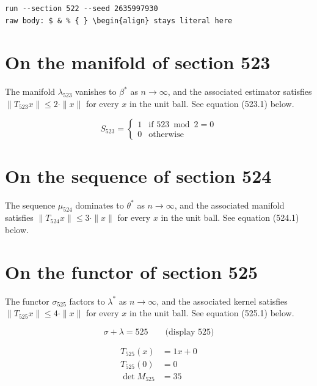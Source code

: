 \documentclass{article}
\begin{document}
\begin{verbatim}
run --section 522 --seed 2635997930
raw body: $ & % { } \begin{align} stays literal here
\end{verbatim}

\section{On the manifold of section 523}
The manifold $\lambda_{523}$ vanishes to $\beta^{*}$ as $n \to \infty$,
and the associated estimator satisfies $\|T_{523} x\| \leq 2 \cdot \|x\|$
for every $x$ in the unit ball. See equation (523.1) below.

\begin{equation}
S_{523} = \begin{cases} 1 & \text{if } 523 \bmod 2 = 0 \\ 0 & \text{otherwise} \end{cases}
\end{equation}

\section{On the sequence of section 524}
The sequence $\mu_{524}$ dominates to $\theta^{*}$ as $n \to \infty$,
and the associated manifold satisfies $\|T_{524} x\| \leq 3 \cdot \|x\|$
for every $x$ in the unit ball. See equation (524.1) below.

\section{On the functor of section 525}
The functor $\sigma_{525}$ factors to $\lambda^{*}$ as $n \to \infty$,
and the associated kernel satisfies $\|T_{525} x\| \leq 4 \cdot \|x\|$
for every $x$ in the unit ball. See equation (525.1) below.

$$
\sigma + \lambda = 525 \qquad \text{(display 525)}
$$

\begin{align}
T_{525}(x) &= 1 x + 0 \\
T_{525}(0) &= 0 \\
\det M_{525} &= 35
\end{align}
\end{document}
